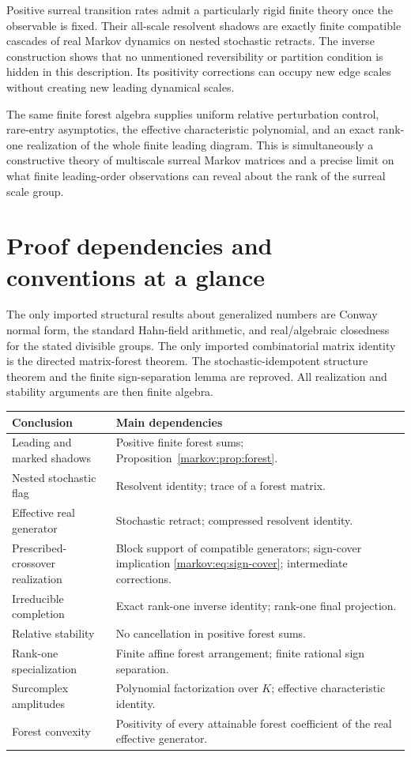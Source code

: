 \documentclass[11pt]{article}
\numberwithin{equation}{section}
\theoremstyle{definition}
\theoremstyle{remark}
\begin{document}
Positive surreal transition rates admit a particularly rigid finite theory once
the observable is fixed. Their all-scale resolvent shadows are exactly finite
compatible cascades of real Markov dynamics on nested stochastic retracts. The
inverse construction shows that no unmentioned reversibility or partition
condition is hidden in this description. Its positivity corrections can occupy
new edge scales without creating new leading dynamical scales.

The same finite forest algebra supplies uniform relative perturbation control,
rare-entry asymptotics, the effective characteristic polynomial, and an exact
rank-one realization of the whole finite leading diagram. This is simultaneously
a constructive theory of multiscale surreal Markov matrices and a precise limit
on what finite leading-order observations can reveal about the rank of the
surreal scale group.

\appendix
\section{Proof dependencies and conventions at a glance}

The only imported structural results about generalized numbers are Conway normal
form, the standard Hahn-field arithmetic, and real/algebraic closedness for the
stated divisible groups. The only imported combinatorial matrix identity is the
directed matrix-forest theorem. The stochastic-idempotent structure theorem and
the finite sign-separation lemma are reproved. All realization and stability
arguments are then finite algebra.

\begin{center}
\begin{tabular}{p{}p{}}
\toprule
Conclusion & Main dependencies\\
\midrule
Leading and marked shadows & Positive finite forest sums; Proposition~\ref{markov:prop:forest}.\\
Nested stochastic flag & Resolvent identity; trace of a forest matrix.\\
Effective real generator & Stochastic retract; compressed resolvent identity.\\
Prescribed-crossover realization & Block support of compatible generators; sign-cover implication \eqref{markov:eq:sign-cover}; intermediate corrections.\\
Irreducible completion & Exact rank-one inverse identity; rank-one final projection.\\
Relative stability & No cancellation in positive forest sums.\\
Rank-one specialization & Finite affine forest arrangement; finite rational sign separation.\\
Surcomplex amplitudes & Polynomial factorization over $K$; effective characteristic identity.\\
Forest convexity & Positivity of every attainable forest coefficient of the real effective generator.\\
\bottomrule
\end{tabular}
\end{center}
\end{document}
